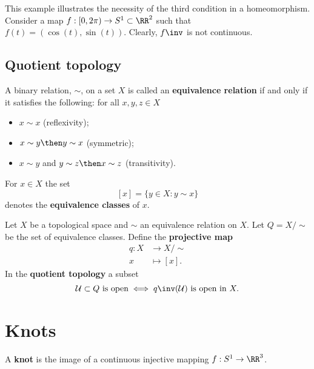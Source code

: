 \documentclass[12pt, a4paper]{article}
\begin{document}
\begin{mdexample}
    This example illustrates the necessity of the third condition in a homeomorphism. Consider a map \(f:[0,2\pi) \to S^1 \subset \RR^2\) such that \(f(t)=(\cos(t),\sin(t))\). Clearly, \(f\inv\) is not continuous.
\end{mdexample}

\subsection{Quotient topology}

\begin{definition}
    A binary relation, \(\sim\), on a set \(X\) is called an \textbf{equivalence relation} if and only if it satisfies the following: for all \(x,y,z \in X\)
    \begin{itemize}
        \item \(x \sim x\) (reflexivity);
        \item \(x\sim y \then y \sim x\) (symmetric);
        \item \(x \sim y\) and \(y \sim z \then x \sim z\) (transitivity).
    \end{itemize}
\end{definition}

\begin{definition}
   For \(x \in X\) the set 
   \[[x] = \{y \in X : y \sim x\}\] 
   denotes the \textbf{equivalence classes} of \(x\).
\end{definition}

\begin{definition}
    Let \(X\) be a topological space and \(\sim\) an equivalence relation on \(X\). Let \(Q = X / \sim\)  be the set of equivalence classes. Define the \textbf{projective map}
    \[\begin{aligned}
        q : X &\to X/ \sim \\
        x &\mapsto [x].
    \end{aligned}\]
    In the \textbf{quotient topology} a subset 
    \[\mathcal{U} \subset Q \text{ is open} \iff q\inv(\mathcal{U}) \text{ is open in } X.\] 
\end{definition}

\section{Knots}

\begin{definition}
    A \textbf{knot} is the image of a continuous injective mapping \(f : S^1 \to \RR^3\).
\end{definition}
\end{document}
